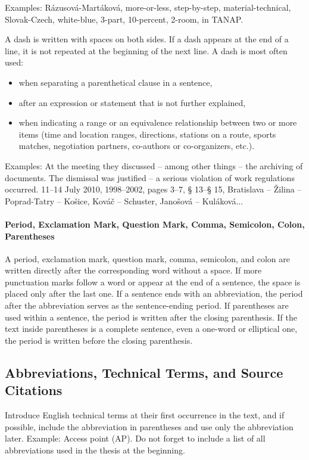 Examples: Rázusová-Martáková, more-or-less, step-by-step, material-technical, Slovak-Czech, white-blue, 3-part, 10-percent, 2-room, in TANAP.

A dash is written with spaces on both sides. If a dash appears at the end of a line, it is not repeated at the beginning of the next line. A dash is most often used:

\begin{itemize}
	\item when separating a parenthetical clause in a sentence,
	\item after an expression or statement that is not further explained,
	\item when indicating a range or an equivalence relationship between two or more items (time and location ranges, directions, stations on a route, sports matches, negotiation partners, co-authors or co-organizers, etc.).
\end{itemize}

Examples: At the meeting they discussed – among other things – the archiving of documents. The dismissal was justified – a serious violation of work regulations occurred. 11–14 July 2010, 1998–2002, pages 3–7, § 13–§ 15, Bratislava – Žilina – Poprad-Tatry – Košice, Kováč – Schuster, Janošová – Kuláková...

\paragraph{Period, Exclamation Mark, Question Mark, Comma, Semicolon, Colon, Parentheses}

A period, exclamation mark, question mark, comma, semicolon, and colon are written directly after the corresponding word without a space. If more punctuation marks follow a word or appear at the end of a sentence, the space is placed only after the last one. If a sentence ends with an abbreviation, the period after the abbreviation serves as the sentence-ending period. If parentheses are used within a sentence, the period is written after the closing parenthesis. If the text inside parentheses is a complete sentence, even a one-word or elliptical one, the period is written before the closing parenthesis.

\subsection{Abbreviations, Technical Terms, and Source Citations}

Introduce English technical terms at their first occurrence in the text, and if possible, include the abbreviation in parentheses and use only the abbreviation later. Example: Access point (AP). Do not forget to include a list of all abbreviations used in the thesis at the beginning.

